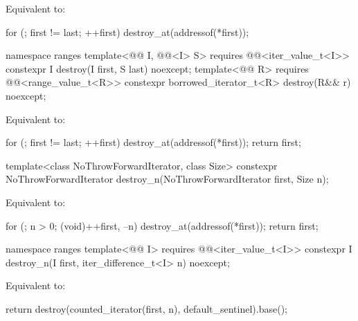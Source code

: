 \begin{itemdescr}
\pnum
\effects
Equivalent to:
\begin{codeblock}
for (; first != last; ++first)
  destroy_at(addressof(*first));
\end{codeblock}
\end{itemdescr}

%
\begin{itemdecl}
namespace ranges {
  template<@@ I, @@<I> S>
    requires @@<iter_value_t<I>>
    constexpr I destroy(I first, S last) noexcept;
  template<@@ R>
    requires @@<range_value_t<R>>
    constexpr borrowed_iterator_t<R> destroy(R&& r) noexcept;
}
\end{itemdecl}

\begin{itemdescr}
\pnum
\effects
Equivalent to:
\begin{codeblock}
for (; first != last; ++first)
  destroy_at(addressof(*first));
return first;
\end{codeblock}
\end{itemdescr}

%
\begin{itemdecl}
template<class NoThrowForwardIterator, class Size>
  constexpr NoThrowForwardIterator destroy_n(NoThrowForwardIterator first, Size n);
\end{itemdecl}

\begin{itemdescr}
\pnum
\effects
Equivalent to:
\begin{codeblock}
for (; n > 0; (void)++first, --n)
  destroy_at(addressof(*first));
return first;
\end{codeblock}
\end{itemdescr}

%
\begin{itemdecl}
namespace ranges {
  template<@@ I>
    requires @@<iter_value_t<I>>
    constexpr I destroy_n(I first, iter_difference_t<I> n) noexcept;
}
\end{itemdecl}

\begin{itemdescr}
\pnum
\effects
Equivalent to:
\begin{codeblock}
return destroy(counted_iterator(first, n), default_sentinel).base();
\end{codeblock}
\end{itemdescr}

